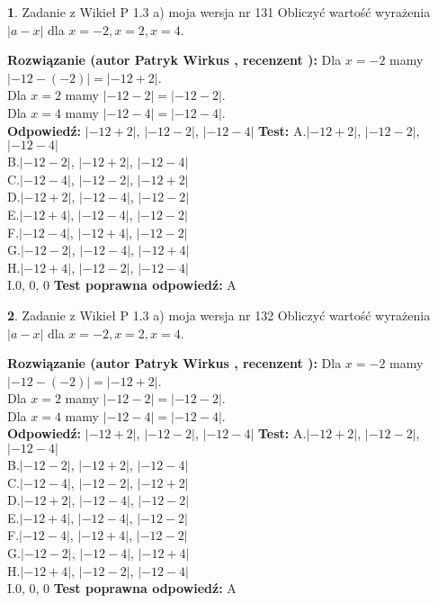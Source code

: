 \documentclass[12pt, a4paper]{article}
\theoremstyle{definition} %
\newtheorem{zad}{}
\newcommand{\zadStart}[1]{\begin{zad}#1\newline}
\newcommand{\zadStop}{\end{zad}}
\newcommand{\rozwStart}[2]{\noindent \textbf{Rozwiązanie (autor #1 , recenzent #2): }\newline}
\newcommand{\rozwStop}{\newline}
\newcommand{\odpStart}{\noindent \textbf{Odpowiedź:}\newline}
\newcommand{\odpStop}{\newline}
\newcommand{\testStart}{\noindent \textbf{Test:}\newline}
\newcommand{\testStop}{\newline}
\newcommand{\kluczStart}{\noindent \textbf{Test poprawna odpowiedź:}\newline}
\newcommand{\kluczStop}{\newline}
\begin{document}
\zadStart{Zadanie z Wikieł P 1.3 a) moja wersja nr 131}
Obliczyć wartość wyrażenia $|a - x|$ dla $x=-2,x=2,x=4$.
\zadStop
\rozwStart{Patryk Wirkus}{}
Dla $x = -2$ mamy $|-12 - (-2)| = |-12 + 2|$.\\
Dla $x = 2$ mamy $|-12 - 2| = |-12 - 2|$.\\
Dla $x = 4$ mamy $|-12 - 4| = |-12 - 4|$.\\
\rozwStop
\odpStart
$|-12 + 2|$, $|-12 - 2|$, $|-12 - 4|$
\odpStop
\testStart
A.$|-12 + 2|$, $|-12 - 2|$, $|-12 - 4|$\\
B.$|-12 - 2|$, $|-12 + 2|$, $|-12 - 4|$\\
C.$|-12 - 4|$, $|-12 - 2|$, $|-12 + 2|$\\
D.$|-12 + 2|$, $|-12 - 4|$, $|-12 - 2|$\\
E.$|-12 + 4|$, $|-12 - 4|$, $|-12 - 2|$\\
F.$|-12 - 4|$, $|-12 + 4|$, $|-12 - 2|$\\
G.$|-12 - 2|$, $|-12 - 4|$, $|-12 + 4|$\\
H.$|-12 + 4|$, $|-12 - 2|$, $|-12 - 4|$\\
I.$0$, $0$, $0$
\testStop
\kluczStart
A
\kluczStop



\zadStart{Zadanie z Wikieł P 1.3 a) moja wersja nr 132}
Obliczyć wartość wyrażenia $|a - x|$ dla $x=-2,x=2,x=4$.
\zadStop
\rozwStart{Patryk Wirkus}{}
Dla $x = -2$ mamy $|-12 - (-2)| = |-12 + 2|$.\\
Dla $x = 2$ mamy $|-12 - 2| = |-12 - 2|$.\\
Dla $x = 4$ mamy $|-12 - 4| = |-12 - 4|$.\\
\rozwStop
\odpStart
$|-12 + 2|$, $|-12 - 2|$, $|-12 - 4|$
\odpStop
\testStart
A.$|-12 + 2|$, $|-12 - 2|$, $|-12 - 4|$\\
B.$|-12 - 2|$, $|-12 + 2|$, $|-12 - 4|$\\
C.$|-12 - 4|$, $|-12 - 2|$, $|-12 + 2|$\\
D.$|-12 + 2|$, $|-12 - 4|$, $|-12 - 2|$\\
E.$|-12 + 4|$, $|-12 - 4|$, $|-12 - 2|$\\
F.$|-12 - 4|$, $|-12 + 4|$, $|-12 - 2|$\\
G.$|-12 - 2|$, $|-12 - 4|$, $|-12 + 4|$\\
H.$|-12 + 4|$, $|-12 - 2|$, $|-12 - 4|$\\
I.$0$, $0$, $0$
\testStop
\kluczStart
A
\kluczStop
\end{document}
